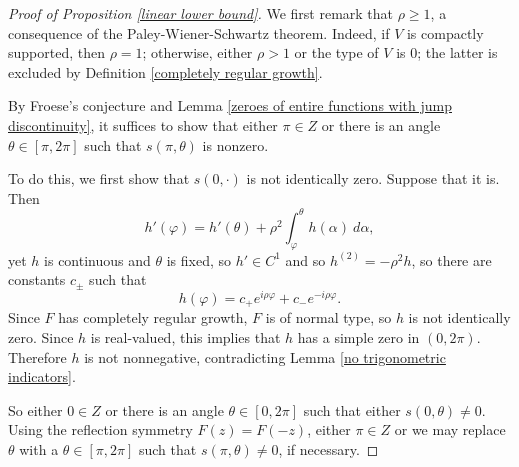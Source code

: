 \documentclass[reqno,12pt,letterpaper]{amsart}
\theoremstyle{definition}
\begin{document}
\begin{proof}[Proof of Proposition \ref{linear lower bound}]
We first remark that $\rho \geq 1$, a consequence of the Paley-Wiener-Schwartz theorem.
Indeed, if $V$ is compactly supported, then $\rho = 1$; otherwise, either $\rho > 1$ or the type of $V$ is $0$; the latter is excluded by Definition \ref{completely regular growth}.

By Froese's conjecture and Lemma \ref{zeroes of entire functions with jump discontinuity}, it suffices to show that either $\pi \in Z$ or there is an angle $\theta \in [\pi, 2\pi]$ such that $s(\pi, \theta)$ is nonzero.

To do this, we first show that $s(0, \cdot)$ is not identically zero. Suppose that it is. Then
$$
h'(\varphi) = h'(\theta) + \rho^2 \int_\varphi^\theta h(\alpha) ~d\alpha,
$$
yet $h$ is continuous and $\theta$ is fixed, so $h' \in C^1$ and so $h^{(2)} = -\rho^2 h$,
so there are constants $c_\pm$ such that
$$h(\varphi) = c_+e^{i\rho\varphi} + c_-e^{-i\rho\varphi}.$$
Since $F$ has completely regular growth, $F$ is of normal type, so $h$ is not identically zero.
Since $h$ is real-valued, this implies that $h$ has a simple zero in $(0, 2\pi)$.
Therefore $h$ is not nonnegative, contradicting Lemma \ref{no trigonometric indicators}.


So either $0 \in Z$ or there is an angle $\theta \in [0, 2\pi]$ such that either $s(0, \theta) \neq 0$.
Using the reflection symmetry $F(z) = F(-z)$, either $\pi \in Z$ or we may replace $\theta$ with a $\theta \in [\pi, 2\pi]$ such that $s(\pi, \theta) \neq 0$, if necessary.
\end{proof}
\end{document}
